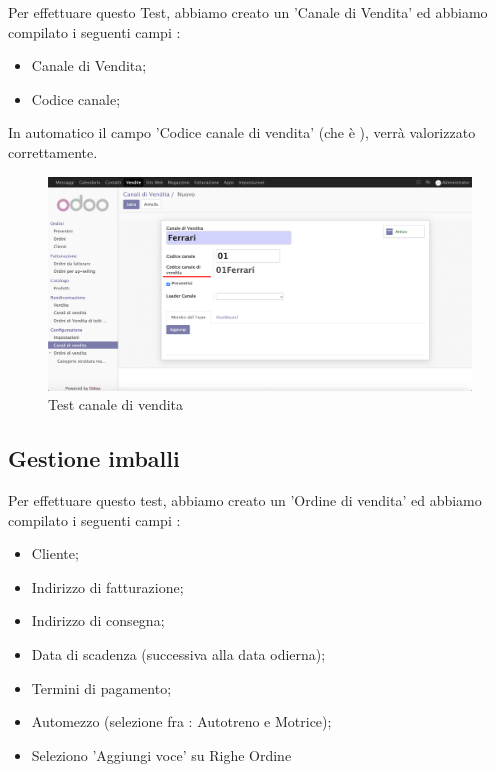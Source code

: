 \vspace*{0.5cm}
Per effettuare questo Test, abbiamo creato un 'Canale di Vendita' ed abbiamo compilato i seguenti campi :
\begin{itemize}
\item Canale di Vendita;
\item Codice canale;
\end{itemize}

In automatico il campo 'Codice canale di vendita' (che è ), verrà valorizzato correttamente.
  
\begin{figure}[H]
	\begin{center} \includegraphics[scale=0.3]{figures/fourth_test}
		\caption[Test canale di vendita]{Test canale di vendita}
		\label{fig:fourth_test}
	\end{center}
\end{figure}


\subsection{Gestione imballi}

Per effettuare questo test, abbiamo creato un 'Ordine di vendita' ed abbiamo compilato i seguenti campi :
\begin{itemize}
	\item Cliente;
	\item Indirizzo di fatturazione;
	\item Indirizzo di consegna;
	\item Data di scadenza (successiva alla data odierna);
	\item Termini di pagamento;
	\item Automezzo (selezione fra : Autotreno e Motrice);
	\item Seleziono 'Aggiungi voce' su Righe Ordine
\end{itemize}

